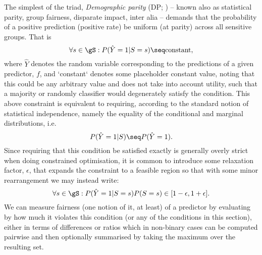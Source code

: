 %
The simplest of the triad, \emph{Demographic parity} (DP; \cite{zemel2013learning,
feldman2015certifying}) -- known also as statistical parity, group fairness, disparate impact,
inter alia -- demands that the probability of a positive prediction (positive rate) be uniform
(at parity) across all sensitive groups. 
%
That is
%
\begin{equation}
    \forall s \in \gS: P( \hat{Y} = 1 | S = s ) \seq \text{constant},
\end{equation}
%
where \(\hat{Y}\) denotes the random variable corresponding to the predictions of a given
predictor, \(f\), and `constant` denotes some placeholder constant value, noting that this could be
any arbitrary value and does not take into account utility, such that a majority or randomly
classifier would degenerately satisfy the condition. 
%
This above constraint is equivalent to requiring, according to the standard notion of statistical
independence, namely the equality of the conditional and marginal distributions, i.e.
%
\begin{equation}
    P( \hat{Y} = 1 | S) \seq P( \hat{Y} = 1 ).
\end{equation}
%
%
Since requiring that this condition be satisfied exactly is generally overly strict when doing
constrained optimisation, it is common to introduce some relaxation factor, \(\epsilon\), that
expands the constraint to a feasible region so that with some minor rearrangement we may instead
write:
%
\begin{equation}
    \forall s \in \gS: P(\hat{Y}=1|S=s) P(S=s) \in [ 1 - \epsilon, 1 + \epsilon ]. 
%
\end{equation}
%
We can measure fairness (one notion of it, at least) of a predictor by evaluating by how much it
violates this condition (or any of the conditions in this section), either in terms of differences
or ratios  which in non-binary cases can be computed pairwise and then optionally summarised by
taking the maximum over the resulting set.

